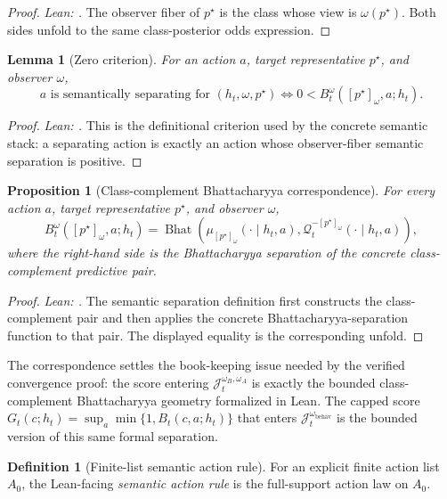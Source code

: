 \documentclass[11pt]{article}
\newtheorem{proposition}[theorem]{Proposition}
\newtheorem{lemma}[theorem]{Lemma}
\theoremstyle{definition}
\newtheorem{definition}[theorem]{Definition}
\theoremstyle{remark}
\theoremstyle{plain}
\theoremstyle{definition}
\newcommand{\Qcal}{\mathcal{Q}}
\begin{document}
\begin{proof}
\noindent\emph{Lean: .}
The observer fiber of $p^\star$ is the class whose view is $\omega(p^\star)$. Both sides unfold to the same class-posterior odds expression.
\end{proof}

\begin{lemma}[Zero criterion]
\label{lem:zero-criterion}
For an action $a$, target representative $p^\star$, and observer $\omega$,
\[
a\text{ is semantically separating for }(h_t,\omega,p^\star)
\iff
0<B_t^\omega([p^\star]_\omega,a;h_t).
\]
\end{lemma}

\begin{proof}
\noindent\emph{Lean: .}
This is the definitional criterion used by the concrete semantic stack: a separating action is exactly an action whose observer-fiber semantic separation is positive.
\end{proof}

\begin{proposition}[Class-complement Bhattacharyya correspondence]
\label{prop:chernoff-correspondence}
For every action $a$, target representative $p^\star$, and observer $\omega$,
\[
B_t^\omega([p^\star]_\omega,a;h_t)
=
\operatorname{Bhat}\!\left(
\mu_{[p^\star]_\omega}(\cdot\mid h_t,a),
\Qcal_t^{-[p^\star]_\omega}(\cdot\mid h_t,a)
\right),
\]
where the right-hand side is the Bhattacharyya separation of the concrete class-complement predictive pair.
\end{proposition}

\begin{proof}
\noindent\emph{Lean: .}
The semantic separation definition first constructs the class-complement pair and then applies the concrete Bhattacharyya-separation function to that pair. The displayed equality is the corresponding unfold.
\end{proof}

The correspondence settles the book-keeping issue needed by the verified convergence proof: the score entering $\mathcal J_t^{\omega_B,\omega_A}$ is exactly the bounded class-complement Bhattacharyya geometry formalized in Lean. The capped score $G_t(c;h_t)=\sup_a\min\{1,B_t(c,a;h_t)\}$ that enters $\mathcal J_t^{\omega_{\mathrm{behav}}}$ is the bounded version of this same formal separation.

\begin{definition}[Finite-list semantic action rule]
\label{def:semantic-rule}
For an explicit finite action list $A_0$, the Lean-facing \emph{semantic action rule} is the full-support action law on $A_0$.
\end{definition}
\end{document}
